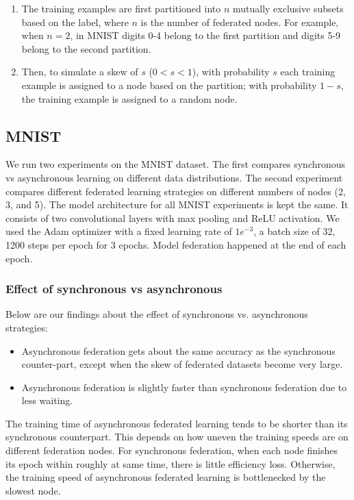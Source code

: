 \documentclass[twocolumn, switch]{article} %
\begin{document}
\begin{enumerate}
    \item The training examples are first partitioned into $n$ mutually exclusive subsets based on the label, where $n$ is the number of federated nodes. For example, when $n=2$, in MNIST digits 0-4 belong to the first partition and digits 5-9 belong to the second partition.

    \item Then, to simulate a skew of $s$ ($0 < s< 1$), with probability $s$ each training example is assigned to a node based on the partition; with probability $1-s$, the training example is assigned to a random node.
\end{enumerate}
 

\subsection{MNIST}

We run two experiments on the MNIST dataset. The first compares synchronous vs asynchronous learning on different data distributions. The second experiment compares different federated learning strategies on different numbers of nodes (2, 3, and 5).  The model architecture for all MNIST experiments is kept the same. It consists of two convolutional layers with max pooling and ReLU activation.
We used the Adam optimizer with a fixed learning rate of $1e^{-3}$, a batch size of 32, 1200 steps per epoch for 3 epochs. Model federation happened at the end of each epoch.

\subsubsection{Effect of synchronous vs asynchronous}

Below are our findings about the effect of synchronous vs. asynchronous strategies:

\begin{itemize}
    \item Asynchronous federation gets about the same accuracy as the synchronous counter-part, except when the skew of federated datasets become very large.
    \item Asynchronous federation is slightly faster than synchronous federation due to less waiting.
\end{itemize}

The training time of asynchronous federated learning tends to be shorter than its synchronous counterpart. This depends on how uneven the training speeds are on different federation nodes. For synchronous federation, when each node finishes its epoch within roughly at same time, there is little efficiency loss. Otherwise, the training speed of asynchronous federated learning is bottlenecked by the slowest node.
\end{document}

